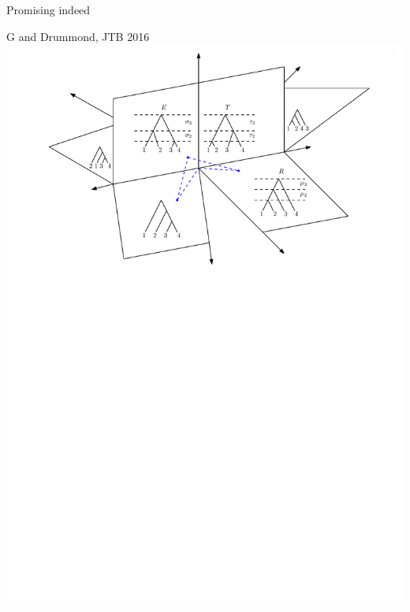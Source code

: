 \documentclass{beamer}
\theoremstyle{example}
\begin{document}
\begin{frame}{Promising indeed}
\begin{block}{G and Drummond, JTB 2016}
\includegraphics[width=\framewidth]{tauSpace}
\end{block}
\end{frame}
\end{document}
